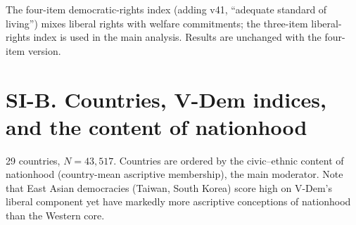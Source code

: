 The four-item democratic-rights index (adding v41, ``adequate standard of living'') mixes liberal rights with welfare commitments; the three-item liberal-rights index is used in the main analysis. Results are unchanged with the four-item version.

\clearpage
\section{SI-B. Countries, V-Dem indices, and the content of nationhood}\label{si-b.-countries-v-dem-indices-and-the-content-of-nationhood}

29 countries, \(N = 43{,}517\). Countries are ordered by the civic--ethnic content of nationhood (country-mean ascriptive membership), the main moderator. Note that East Asian democracies (Taiwan, South Korea) score high on V-Dem's liberal component yet have markedly more ascriptive conceptions of nationhood than the Western core.


